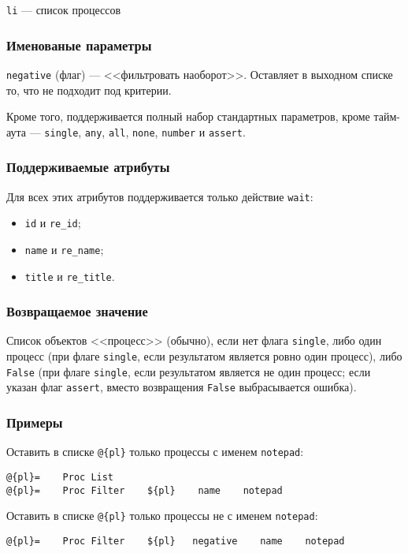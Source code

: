 \documentclass[11pt]{book} %
\begin{document}
\verb"li" --- список процессов

\subsubsection*{Именованые параметры} 


\verb"negative" (флаг) --- <<фильтровать наоборот>>. Оставляет в выходном списке то, что не подходит под критерии.

Кроме того, поддерживается полный набор стандартных параметров, кроме тайм-аута --- \verb"single", \verb|any|, \verb|all|, \verb|none|, \verb|number| и \verb"assert".

\subsubsection*{Поддерживаемые атрибуты} 

Для всех этих атрибутов поддерживается только действие \verb|wait|:

\begin{itemize}
	\item \verb"id" и \verb"re_id";
	\item \verb"name" и \verb"re_name";
	\item \verb"title" и \verb"re_title".
\end{itemize}



\subsubsection*{Возвращаемое значение} 
Список объектов <<процесс>> (обычно), если нет флага \verb"single", либо один процесс (при флаге \verb"single", если результатом является ровно один процесс), либо \verb"False" (при флаге \verb"single", если результатом является не один процесс; если указан флаг \verb"assert", вместо возвращения \verb"False" выбрасывается ошибка).

\subsubsection*{Примеры}
Оставить в списке \verb"@{pl}" только процессы с именем \verb"notepad":
\begin{verbatim}@{pl}=    Proc List
@{pl}=    Proc Filter    ${pl}    name    notepad\end{verbatim}

Оставить в списке \verb"@{pl}" только процессы не с именем \verb"notepad":
\begin{verbatim}@{pl}=    Proc Filter    ${pl}   negative    name    notepad\end{verbatim}
\end{document}
